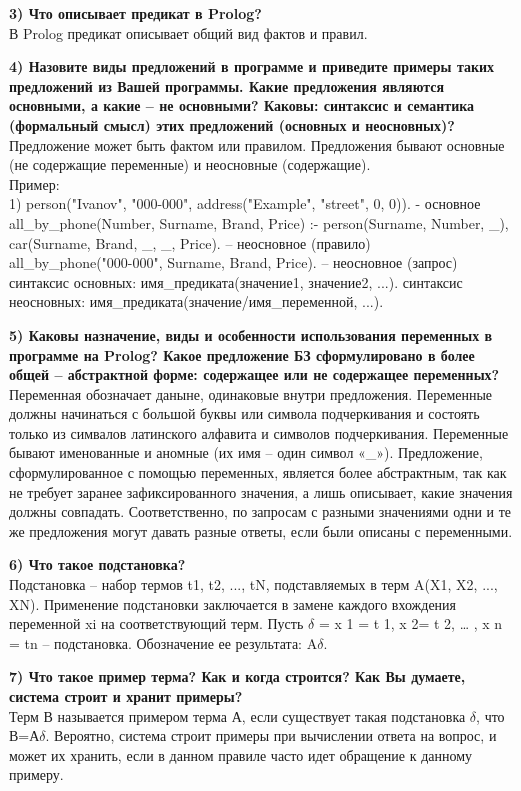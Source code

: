 \documentclass[a4paper, 12pt]{article}
\begin{document}
\hspace*{-13mm} \textbf{3) Что описывает предикат в Prolog?}
\\ В Prolog предикат описывает общий вид фактов и правил.

\hspace*{-13mm} \textbf{4) Назовите виды предложений в программе и приведите примеры таких предложений из Вашей программы. Какие предложения являются основными, а какие – не основными?  Каковы: синтаксис и семантика (формальный смысл) этих предложений (основных и неосновных)?}
\\ Предложение может быть фактом или правилом. Предложения бывают основные (не содержащие переменные) и неосновные (содержащие).
\\ Пример:
	\\1) person("Ivanov", "000-000", address("Example", "street", 0, 0)). - основное
	all\_by\_phone(Number, Surname, Brand, Price) :- person(Surname, Number, \_), car(Surname, Brand, \_, \_, Price). – неосновное (правило)
	\\ all\_by\_phone("000-000", Surname, Brand, Price). – неосновное (запрос)
	синтаксис основных: имя\_предиката(значение1, значение2, ...).
	синтаксис неосновных: имя\_предиката(значение/имя\_переменной, ...).
	
\hspace*{-13mm} \textbf{5) Каковы назначение, виды и особенности использования переменных в программе на Prolog? Какое предложение БЗ сформулировано в более общей – абстрактной форме: содержащее или не содержащее переменных?}
\\ Переменная обозначает даныне, одинаковые внутри предложения. Переменные должны начинаться с большой буквы или символа подчеркивания и состоять только из симвалов латинского алфавита и символов подчеркивания. Переменные бывают именованные и аномные (их имя – один символ «\_»). Предложение, сформулированное с помощью переменных, является более абстрактным, так как не требует заранее зафиксированного значения, а лишь описывает, какие значения должны совпадать. Соответственно, по запросам с разными значениями одни и те же предложения могут давать разные ответы, если были описаны с переменными.

\hspace*{-13mm} \textbf{6) Что такое подстановка?}
\\ Подстановка – набор термов t1, t2, ..., tN, подставляемых в терм A(X1, X2, ..., XN). Применение подстановки заключается в замене каждого вхождения переменной xi  на соответствующий терм. Пусть $\delta$ =  { x 1 = t 1, x 2= t 2, … , x n = tn } – подстановка. Обозначение ее результата: A$\delta$.

\hspace*{-13mm} \textbf{7) Что такое пример терма? Как и когда строится? Как Вы думаете, система строит и хранит примеры?}
\\ Терм В называется примером терма А, если существует такая подстановка $\delta$, что В=А$\delta$.
Вероятно, система строит примеры при вычислении ответа на вопрос, и может их хранить, если в данном правиле часто идет обращение  к данному примеру.
\end{document}
